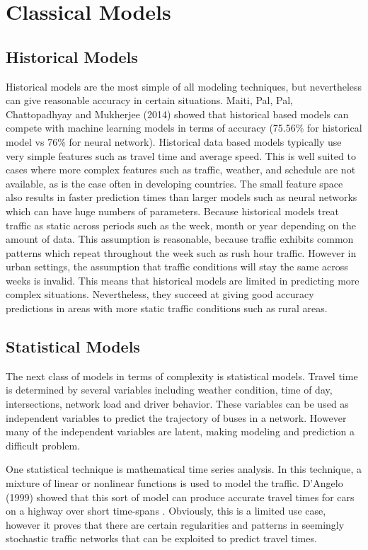 \section{Classical Models}

\subsection{Historical Models}

Historical models are the most simple of all modeling techniques, but nevertheless can give reasonable accuracy in certain situations.
Maiti, Pal, Pal, Chattopadhyay and Mukherjee (2014) showed that historical based models can compete with machine learning models in terms of accuracy (75.56\% for historical model vs 76\% for neural network)\cite{maiti2014historical}.
Historical data based models typically use very simple features such as travel time and average speed.
This is well suited to cases where more complex features such as traffic, weather, and schedule are not available, as is the case often in developing countries.
The small feature space also results in faster prediction times than larger models such as neural networks which can have huge numbers of parameters.
Because historical models treat traffic as static across periods such as the week, month or year depending on the amount of data.
This assumption is reasonable, because traffic exhibits common patterns which repeat throughout the week such as rush hour traffic.
However in urban settings, the assumption that traffic conditions will stay the same across weeks is invalid.
This means that historical models are limited in predicting more complex situations.
Nevertheless, they succeed at giving good accuracy predictions in areas with more static traffic conditions such as rural areas.

\subsection{Statistical Models}

The next class of models in terms of complexity is statistical models.
Travel time is determined by several variables including weather condition, time of day, intersections, network load and driver behavior.
These variables can be used as independent variables to predict the trajectory of buses in a network.
However many of the independent variables are latent, making modeling and prediction a difficult problem.

One statistical technique is mathematical time series analysis.
In this technique, a mixture of linear or nonlinear functions is used to model the traffic.
D'Angelo (1999) showed that this sort of model can produce accurate travel times for cars on a highway over short time-spans \cite{d1999travel}.
Obviously, this is a limited use case, however it proves that there are certain regularities and patterns in seemingly stochastic traffic networks that can be exploited to predict travel times.

